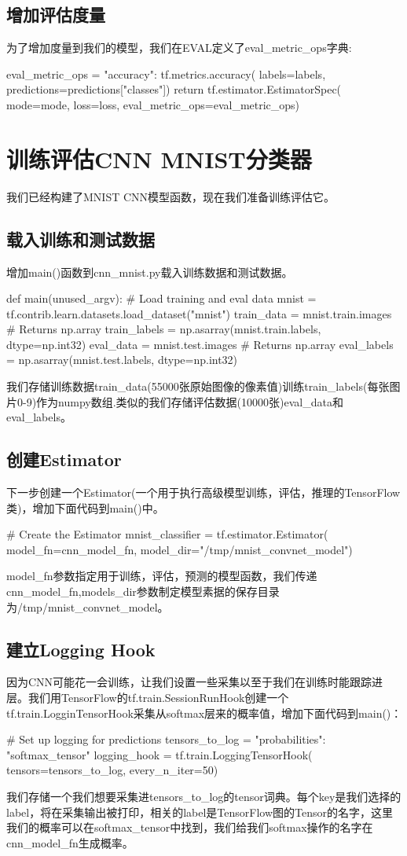 \subsection{增加评估度量}
为了增加度量到我们的模型，我们在EVAL定义了eval\_metric\_ops字典:
\begin{python}
eval_metric_ops = {
    "accuracy": tf.metrics.accuracy(
        labels=labels, predictions=predictions["classes"])}
return tf.estimator.EstimatorSpec(
    mode=mode, loss=loss, eval_metric_ops=eval_metric_ops)
\end{python}
\section{训练评估CNN MNIST分类器}
我们已经构建了MNIST CNN模型函数，现在我们准备训练评估它。
\subsection{载入训练和测试数据}
增加main()函数到cnn\_mnist.py载入训练数据和测试数据。
\begin{python}
def main(unused_argv):
  # Load training and eval data
  mnist = tf.contrib.learn.datasets.load_dataset("mnist")
  train_data = mnist.train.images # Returns np.array
  train_labels = np.asarray(mnist.train.labels, dtype=np.int32)
  eval_data = mnist.test.images # Returns np.array
  eval_labels = np.asarray(mnist.test.labels, dtype=np.int32)
\end{python}
我们存储训练数据train\_data(55000张原始图像的像素值)训练train\_labels(每张图片0-9)作为numpy数组.类似的我们存储评估数据(10000张)eval\_data和eval\_labels。
\subsection{创建Estimator}
下一步创建一个Estimator(一个用于执行高级模型训练，评估，推理的TensorFlow类)，增加下面代码到main()中。
\begin{python}
# Create the Estimator
mnist_classifier = tf.estimator.Estimator(
    model_fn=cnn_model_fn, model_dir="/tmp/mnist_convnet_model")
\end{python}
model\_fn参数指定用于训练，评估，预测的模型函数，我们传递cnn\_model\_fn,models\_dir参数制定模型素据的保存目录为/tmp/mnist\_convnet\_model。
\subsection{建立Logging Hook}
因为CNN可能花一会训练，让我们设置一些采集以至于我们在训练时能跟踪进层。我们用TensorFlow的tf.train.SessionRunHook创建一个tf.train.LogginTensorHook采集从softmax层来的概率值，增加下面代码到main()：
\begin{python}
# Set up logging for predictions
  tensors_to_log = {"probabilities": "softmax_tensor"}
  logging_hook = tf.train.LoggingTensorHook(
      tensors=tensors_to_log, every_n_iter=50)
\end{python}
我们存储一个我们想要采集进tensors\_to\_log的tensor词典。每个key是我们选择的label，将在采集输出被打印，相关的label是TensorFlow图的Tensor的名字，这里我们的概率可以在softmax\_tensor中找到，我们给我们softmax操作的名字在cnn\_model\_fn生成概率。

